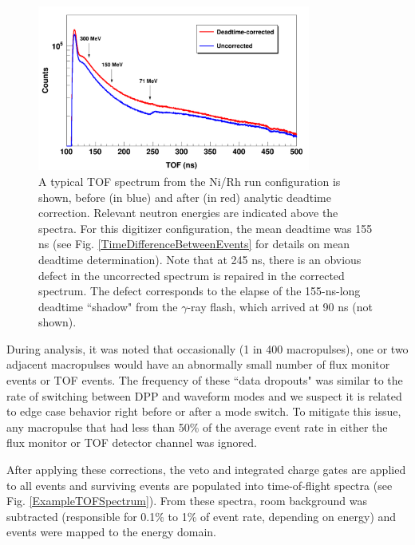 \begin{figure}[h]
    \centering
    \includegraphics[width=0.8\textwidth]{figures/CorrectionEffectOnTOF.png}
    \caption[The effect of deadtime correction on a typical time-of-flight spectrum]
    {A typical TOF spectrum from the Ni/Rh
        run configuration is shown, before (in blue) and after (in red) analytic
        deadtime correction. Relevant neutron energies are indicated above the spectra.
        For this digitizer configuration, the mean deadtime was 155 ns (see Fig.
        \ref{TimeDifferenceBetweenEvents} for details on mean deadtime determination).
        Note that at 245 ns, there is an
        obvious defect in the uncorrected spectrum is repaired in the corrected
        spectrum. The defect
        corresponds to the elapse of the 155-ns-long deadtime ``shadow" from the $\gamma$-ray
        flash, which arrived at 90 ns (not shown).}
    \label{CorrectionEffectOnTOF}
\end{figure}

During analysis, it was noted that occasionally (1 in 400 macropulses), one or two 
adjacent macropulses would have an abnormally small number of flux monitor events or 
TOF events. The frequency of these ``data dropouts" was similar to the rate of
switching between DPP and waveform modes and we suspect it is related to edge
case behavior right before or after a mode switch. To mitigate this issue,
any macropulse that had less than 50\% of the average event rate in either the
flux monitor or TOF detector channel was ignored.

After applying these corrections, the veto and integrated charge gates are applied to 
all events and surviving events are populated into time-of-flight spectra (see Fig.
\ref{ExampleTOFSpectrum}). From these spectra, room background was subtracted
(responsible for 0.1\% to 1\% of event rate, depending on energy)
and events were mapped to the energy domain.

